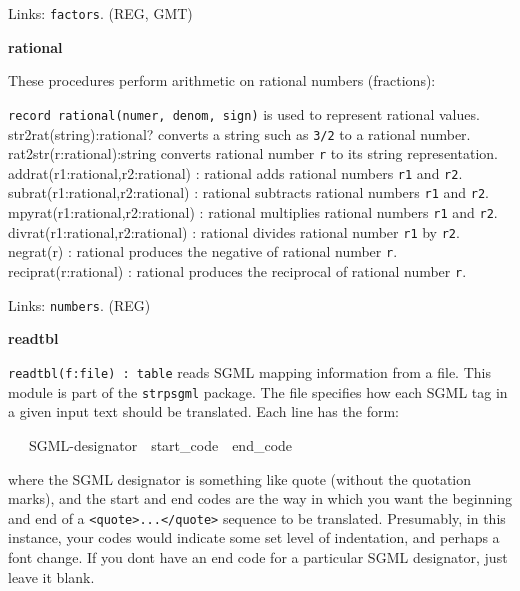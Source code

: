 Links: \texttt{factors}. (REG, GMT)

{\sffamily\bfseries
rational}

These procedures perform arithmetic on rational
numbers (fractions):

\texttt{record rational(numer, denom, sign)} is used to represent
rational values.\\
\textsf{str2rat(string):rational?} converts a string such as
\texttt{{\textquotedbl}3/2{\textquotedbl}} to a rational
number.\\
\textsf{rat2str(r:rational):string} converts rational number \texttt{r}
to its string representation.\\
\textsf{addrat(r1:rational,r2:rational) : rational} adds rational
numbers \texttt{r1} and \texttt{r2}.\\
\textsf{subrat(r1:rational,r2:rational) : rational} subtracts rational
numbers \texttt{r1} and \texttt{r2}.\\
\textsf{mpyrat(r1:rational,r2:rational) : rational} multiplies rational
numbers \texttt{r1} and \texttt{r2}.\\
\textsf{divrat(r1:rational,r2:rational) : rational} divides rational
number \texttt{r1} by \texttt{r2}.\\
\textsf{negrat(r) : rational} produces the negative of rational number
\texttt{r}.\\
\textsf{reciprat(r:rational) : rational} produces the reciprocal of
rational number \texttt{r}.

Links: \texttt{numbers}. (REG)

{\sffamily\bfseries
readtbl}

\texttt{readtbl(f:file) : table} reads SGML mapping
information from a file. This module is part of the \texttt{strpsgml}
package. The file specifies how each SGML tag in a given input text
should be translated. Each line has the form:

\ \ \ SGML-designator\ \ start\_code\ \ end\_code

where the SGML designator is something like
{\textquotedbl}quote{\textquotedbl} (without the quotation marks), and
the start and end codes are the way in which you want the beginning and
end of a
\texttt{{\textless}quote{\textgreater}...{\textless}/quote{\textgreater}}
sequence to be translated. Presumably, in this instance, your codes
would indicate some set level of indentation, and perhaps a font
change. If you don{\textquotesingle}t have an end code for a particular
SGML designator, just leave it blank.

